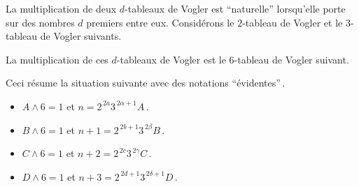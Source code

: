 \begin{example}
	La multiplication de deux $d$-tableaux de Vogler est \enquote{naturelle} lorsqu'elle porte sur des nombres $d$ premiers entre eux.
	Considérons le $2$-tableau de Vogler et le $3$-tableau de Vogler suivants.
	
	\vspace{-1.5ex}
	\begin{multicols}{2}
	\begin{center}
	\end{center}

	\begin{center}
	\end{center}
	\end{multicols}


	\vspace{-1ex}
	La multiplication de ces $d$-tableaux de Vogler est le $6$-tableau de Vogler suivant.

	\begin{center}
	\end{center}
	
	Ceci résume la situation suivante avec des notations \enquote{évidentes}\,. 
	
	\begin{itemize}
		\item $A \wedge 6 = 1$
		      et
		      $n     = 2^{\,2a}   3^{\,2\alpha+1} A$\,.

		\item $B \wedge 6 = 1$
		      et
		      $n + 1 = 2^{\,2b+1} 3^{\,2\beta}    B$\,.

		\item $C \wedge 6 = 1$
		      et
		      $n + 2 = 2^{\,2c}   3^{\,2\gamma}   C$\,.

		\item $D \wedge 6 = 1$
		      et
		      $n + 3 = 2^{\,2d+1} 3^{\,2\delta+1} D$\,.
	\end{itemize}
\end{example}


